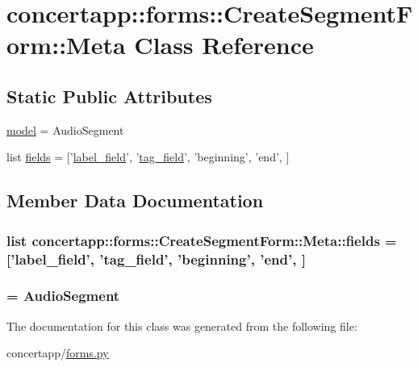 \hypertarget{classconcertapp_1_1forms_1_1_create_segment_form_1_1_meta}{
\section{concertapp::forms::CreateSegmentForm::Meta Class Reference}
\label{classconcertapp_1_1forms_1_1_create_segment_form_1_1_meta}
}
\subsection*{Static Public Attributes}
\begin{DoxyCompactItemize}
\item 
\hyperlink{classconcertapp_1_1forms_1_1_create_segment_form_1_1_meta_a08f25d497dbff6bfee3d699e73ad9ffa}{model} = AudioSegment
\item 
list \hyperlink{classconcertapp_1_1forms_1_1_create_segment_form_1_1_meta_a3dce7296f614d9bee1f3fa17718611d4}{fields} = \mbox{[}'\hyperlink{classconcertapp_1_1forms_1_1_create_segment_form_a343943e12b01273bf2178048f2d0cb49}{label\_\-field}', '\hyperlink{classconcertapp_1_1forms_1_1_create_segment_form_a3253354235460c739c5128a37a72c4bb}{tag\_\-field}', 'beginning', 'end', \mbox{]}
\end{DoxyCompactItemize}


\subsection{Member Data Documentation}
\hypertarget{classconcertapp_1_1forms_1_1_create_segment_form_1_1_meta_a3dce7296f614d9bee1f3fa17718611d4}{
\subsubsection[{fields}]{\setlength{\rightskip}{0pt plus 5cm}list {\bf concertapp::forms::CreateSegmentForm::Meta::fields} = \mbox{[}'{\bf label\_\-field}', '{\bf tag\_\-field}', 'beginning', 'end', \mbox{]}}}
\label{classconcertapp_1_1forms_1_1_create_segment_form_1_1_meta_a3dce7296f614d9bee1f3fa17718611d4}
\hypertarget{classconcertapp_1_1forms_1_1_create_segment_form_1_1_meta_a08f25d497dbff6bfee3d699e73ad9ffa}{
\subsubsection[{model}]{ = AudioSegment}}
\label{classconcertapp_1_1forms_1_1_create_segment_form_1_1_meta_a08f25d497dbff6bfee3d699e73ad9ffa}


The documentation for this class was generated from the following file:\begin{DoxyCompactItemize}
\item 
concertapp/\hyperlink{forms_8py}{forms.py}\end{DoxyCompactItemize}
